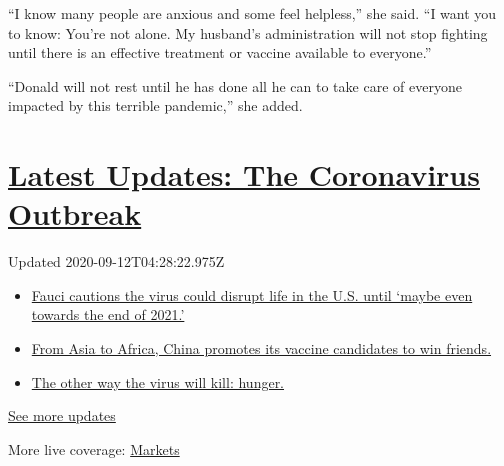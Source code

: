 ``I know many people are anxious and some feel helpless,'' she said. ``I
want you to know: You're not alone. My husband's administration will not
stop fighting until there is an effective treatment or vaccine available
to everyone.''

``Donald will not rest until he has done all he can to take care of
everyone impacted by this terrible pandemic,'' she added.

\hypertarget{latest-updates-the-coronavirus-outbreak}{%
\section{\texorpdfstring{\href{https://www.nytimes3xbfgragh.onion/2020/09/11/world/covid-19-coronavirus.html?action=click\&pgtype=Article\&state=default\&region=MAIN_CONTENT_1\&context=storylines_live_updates}{Latest
Updates: The Coronavirus
Outbreak}}{Latest Updates: The Coronavirus Outbreak}}\label{latest-updates-the-coronavirus-outbreak}}

Updated 2020-09-12T04:28:22.975Z

\begin{itemize}
\tightlist
\item
  \href{https://www.nytimes3xbfgragh.onion/2020/09/11/world/covid-19-coronavirus.html?action=click\&pgtype=Article\&state=default\&region=MAIN_CONTENT_1\&context=storylines_live_updates\#link-dfb8a16}{Fauci
  cautions the virus could disrupt life in the U.S. until `maybe even
  towards the end of 2021.'}
\item
  \href{https://www.nytimes3xbfgragh.onion/2020/09/11/world/covid-19-coronavirus.html?action=click\&pgtype=Article\&state=default\&region=MAIN_CONTENT_1\&context=storylines_live_updates\#link-7104d154}{From
  Asia to Africa, China promotes its vaccine candidates to win friends.}
\item
  \href{https://www.nytimes3xbfgragh.onion/2020/09/11/world/covid-19-coronavirus.html?action=click\&pgtype=Article\&state=default\&region=MAIN_CONTENT_1\&context=storylines_live_updates\#link-393ad215}{The
  other way the virus will kill: hunger.}
\end{itemize}

\href{https://www.nytimes3xbfgragh.onion/2020/09/11/world/covid-19-coronavirus.html?action=click\&pgtype=Article\&state=default\&region=MAIN_CONTENT_1\&context=storylines_live_updates}{See
more updates}

More live coverage:
\href{https://www.nytimes3xbfgragh.onion/live/2020/09/11/business/stock-market-today-coronavirus?action=click\&pgtype=Article\&state=default\&region=MAIN_CONTENT_1\&context=storylines_live_updates}{Markets}

